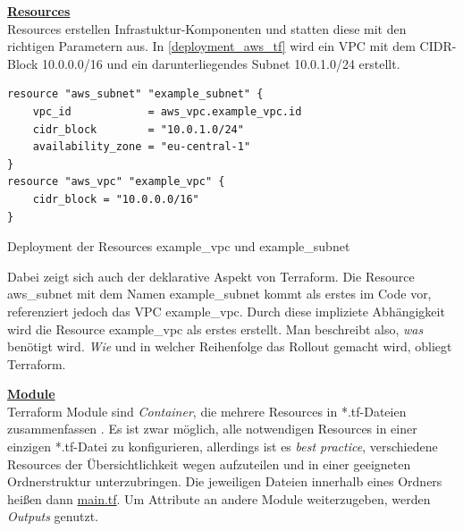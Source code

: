 \textbf{\underline{Resources}}\\
Resources erstellen Infrastuktur-Komponenten und statten diese mit den richtigen Parametern aus. In \ref{deployment_aws_tf} wird ein VPC mit dem CIDR-Block 10.0.0.0/16 und ein darunterliegendes Subnet 10.0.1.0/24 erstellt.
\begin{listing}[h]
\begin{verbatim}
resource "aws_subnet" "example_subnet" {
    vpc_id            = aws_vpc.example_vpc.id
    cidr_block        = "10.0.1.0/24"
    availability_zone = "eu-central-1"
}
resource "aws_vpc" "example_vpc" {
    cidr_block = "10.0.0.0/16"
}
\end{verbatim}
\caption{Deployment der Resources \glqq example\_vpc\grqq{} und \glqq example\_subnet\grqq{}}
\label{deployment_aws_tf}
\end{listing}
Dabei zeigt sich auch der deklarative Aspekt von Terraform. Die Resource \glqq aws\_subnet\grqq{} mit dem Namen \glqq example\_subnet\grqq{} kommt als erstes im Code vor, referenziert jedoch das VPC \glqq example\_vpc\grqq{}. Durch diese impliziete Abhängigkeit wird die Resource \glqq example\_vpc\grqq{} als erstes erstellt. Man beschreibt also, \textit{was} benötigt wird. \textit{Wie} und in welcher Reihenfolge das Rollout gemacht wird, obliegt Terraform.

\textbf{\underline{Module}}\\
Terraform Module sind \textit{Container}, die mehrere Resources in *.tf-Dateien zusammenfassen \cite{tfmodule2021}. Es ist zwar möglich, alle notwendigen Resources in einer einzigen *.tf-Datei zu konfigurieren, allerdings ist es \textit{best practice}, verschiedene Resources der Übersichtlichkeit wegen aufzuteilen und in einer geeigneten Ordnerstruktur unterzubringen. Die jeweiligen Dateien innerhalb eines Ordners heißen dann \underline{main.tf}. Um Attribute an andere Module weiterzugeben, werden \textit{Outputs} genutzt. 

